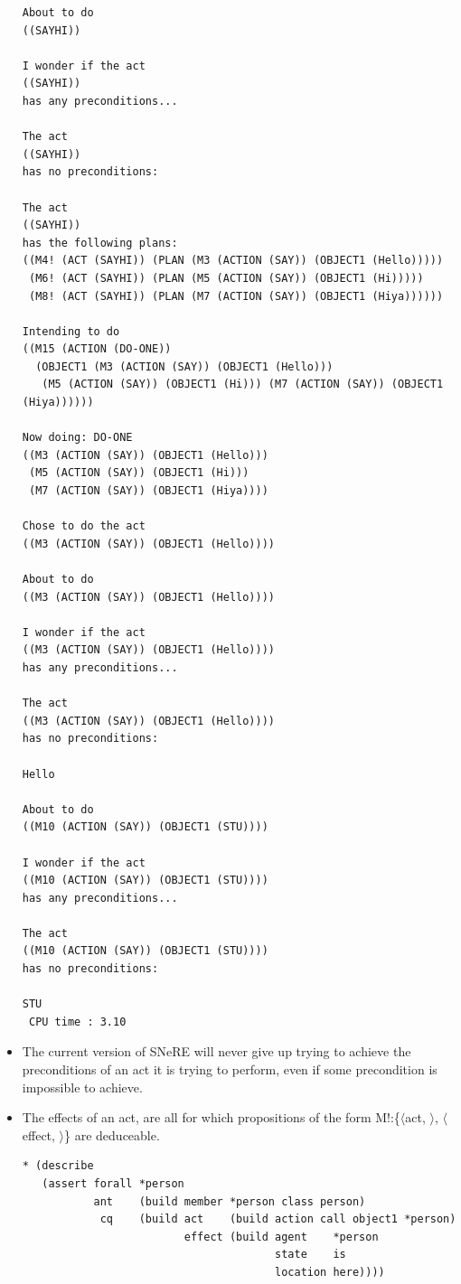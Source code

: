 \documentclass{book}
\makeatletter
\newcommand{\ct}[1]{{\ttfamily #1}} %
\newcommand{\cv}[1]{{\ttfamily{\itshape #1}}} %
\newcommand{\indexct}[1]{\index{#1@\ct{#1}}} %
\makeatother
\begin{document}
\begin{itemize}
\begin{verbatim}
About to do 
((SAYHI))

I wonder if the act 
((SAYHI))
has any preconditions...

The act 
((SAYHI))
has no preconditions:

The act 
((SAYHI))
has the following plans:
((M4! (ACT (SAYHI)) (PLAN (M3 (ACTION (SAY)) (OBJECT1 (Hello)))))
 (M6! (ACT (SAYHI)) (PLAN (M5 (ACTION (SAY)) (OBJECT1 (Hi)))))
 (M8! (ACT (SAYHI)) (PLAN (M7 (ACTION (SAY)) (OBJECT1 (Hiya))))))

Intending to do
((M15 (ACTION (DO-ONE))
  (OBJECT1 (M3 (ACTION (SAY)) (OBJECT1 (Hello)))
   (M5 (ACTION (SAY)) (OBJECT1 (Hi))) (M7 (ACTION (SAY)) (OBJECT1 (Hiya))))))

Now doing: DO-ONE 
((M3 (ACTION (SAY)) (OBJECT1 (Hello)))
 (M5 (ACTION (SAY)) (OBJECT1 (Hi)))
 (M7 (ACTION (SAY)) (OBJECT1 (Hiya))))

Chose to do the act 
((M3 (ACTION (SAY)) (OBJECT1 (Hello))))

About to do 
((M3 (ACTION (SAY)) (OBJECT1 (Hello))))

I wonder if the act 
((M3 (ACTION (SAY)) (OBJECT1 (Hello))))
has any preconditions...

The act 
((M3 (ACTION (SAY)) (OBJECT1 (Hello))))
has no preconditions:

Hello

About to do 
((M10 (ACTION (SAY)) (OBJECT1 (STU))))

I wonder if the act 
((M10 (ACTION (SAY)) (OBJECT1 (STU))))
has any preconditions...

The act 
((M10 (ACTION (SAY)) (OBJECT1 (STU))))
has no preconditions:

STU
 CPU time : 3.10 
\end{verbatim}

\item The current version of SNeRE will never give up trying to
achieve the preconditions of an act it is trying to perform, even if
some precondition is impossible to achieve.

\item The effects of an act, \cv{a} are all \cv{e} for which propositions of
the form {\ttfamily M!:\{$\langle$act, \cv{a}$\rangle$, $\langle$effect,
\cv{e}$\rangle$\}}\indexct{act-effect} are deduceable.
\begin{verbatim}
* (describe
   (assert forall *person
           ant    (build member *person class person)
            cq    (build act    (build action call object1 *person)
                         effect (build agent    *person
                                       state    is
                                       location here))))


\end{verbatim}
\end{itemize}
\end{document}
